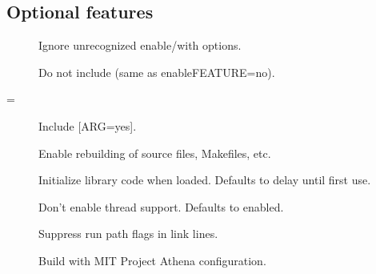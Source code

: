 \documentclass[letterpaper,10pt,english]{sphinxmanual}
\begin{document}
\subsection{Optional features}
\label{\detokenize{build/options2configure:optional-features}}\begin{description}
\item[{\sphinxstylestrong{\sphinxhyphen{}}}] \leavevmode
\sphinxAtStartPar
Ignore unrecognized \textendash{}enable/\textendash{}with options.

\item[{\sphinxstylestrong{\sphinxhyphen{}}}] \leavevmode
\sphinxAtStartPar
Do not include  (same as \textendash{}enable\sphinxhyphen{}FEATURE=no).

\item[{\sphinxstylestrong{\sphinxhyphen{}}\sphinxstyleemphasis{FEATURE}{[}=\sphinxstyleemphasis{ARG}{]}}] \leavevmode
\sphinxAtStartPar
Include  {[}ARG=yes{]}.

\item[{\sphinxstylestrong{\sphinxhyphen{}}}] \leavevmode
\sphinxAtStartPar
Enable rebuilding of source files, Makefiles, etc.

\item[{\sphinxstylestrong{\sphinxhyphen{}}}] \leavevmode
\sphinxAtStartPar
Initialize library code when loaded.  Defaults to delay until
first use.

\item[{\sphinxstylestrong{\sphinxhyphen{}}}] \leavevmode
\sphinxAtStartPar
Don’t enable thread support.  Defaults to enabled.

\item[{\sphinxstylestrong{\sphinxhyphen{}}}] \leavevmode
\sphinxAtStartPar
Suppress run path flags in link lines.

\item[{\sphinxstylestrong{\sphinxhyphen{}}}] \leavevmode
\sphinxAtStartPar
Build with MIT Project Athena configuration.


\end{description}
\end{document}
